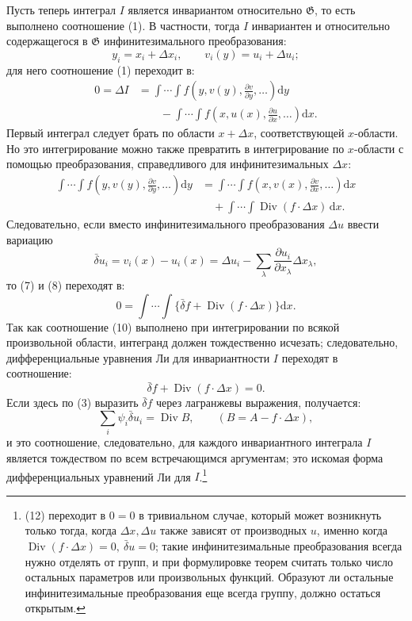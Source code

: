 \documentclass[11pt]{article}
\providecommand{\G}{\mathfrak G}
\providecommand{\D}{\Delta}
\providecommand{\p}{\partial}
\providecommand{\dd}{\mathrm d}
\DeclareMathOperator{\Div}{Div}
\providecommand{\bd}{\bar{\delta}}
\begin{document}
Пусть теперь интеграл \(I\) является инвариантом относительно \(\G\), то есть выполнено соотношение (1). В частности, тогда \(I\) инвариантен и относительно содержащегося в \(\G\) инфинитезимального преобразования:
\[
y_i=x_i+\D x_i,\qquad v_i(y)=u_i+\D u_i;
\]
для него соотношение (1) переходит в:
\begin{equation}
\begin{aligned}
0=\D I
&=\int\!\cdots\!\int f\!\left(y,v(y),\frac{\p v}{\p y},\ldots\right)\dd y\\
&\qquad-\int\!\cdots\!\int f\!\left(x,u(x),\frac{\p u}{\p x},\ldots\right)\dd x.
\end{aligned}
\tag{7}
\end{equation}
Первый интеграл следует брать по области \(x+\D x\), соответствующей \(x\)-области. Но это интегрирование можно также превратить в интегрирование по \(x\)-области с помощью преобразования, справедливого для инфинитезимальных \(\D x\):
\begin{equation}
\begin{aligned}
\int\!\cdots\!\int f\!\left(y,v(y),\frac{\p v}{\p y},\ldots\right)\dd y
&=\int\!\cdots\!\int f\!\left(x,v(x),\frac{\p v}{\p x},\ldots\right)\dd x\\
&\quad+\int\!\cdots\!\int \Div(f\cdot \D x)\,\dd x.
\end{aligned}
\tag{8}
\end{equation}
Следовательно, если вместо инфинитезимального преобразования \(\D u\) ввести вариацию
\begin{equation}
\bd u_i=v_i(x)-u_i(x)=\D u_i-\sum_\lambda\frac{\p u_i}{\p x_\lambda}\D x_\lambda,
\tag{9}
\end{equation}
то (7) и (8) переходят в:
\begin{equation}
0=\int\!\cdots\!\int\{\bd f+\Div(f\cdot\D x)\}\dd x.
\tag{10}
\end{equation}
Так как соотношение (10) выполнено при интегрировании по всякой произвольной области, интегранд должен тождественно исчезать; следовательно, дифференциальные уравнения Ли для инвариантности \(I\) переходят в соотношение:
\begin{equation}
\bd f+\Div(f\cdot\D x)=0.
\tag{11}
\end{equation}
Если здесь по (3) выразить \(\bd f\) через лагранжевы выражения, получается:
\begin{equation}
\sum_i\psi_i\bd u_i=\Div B,\qquad (B=A-f\cdot\D x),
\tag{12}
\end{equation}
и это соотношение, следовательно, для каждого инвариантного интеграла \(I\) является тождеством по всем встречающимся аргументам; это искомая форма дифференциальных уравнений Ли для \(I\).\footnote{(12) переходит в \(0=0\) в тривиальном случае, который может возникнуть только тогда, когда \(\D x,\D u\) также зависят от производных \(u\), именно когда \(\Div(f\cdot\D x)=0,\ \bd u=0\); такие инфинитезимальные преобразования всегда нужно отделять от групп, и при формулировке теорем считать только число остальных параметров или произвольных функций. Образуют ли остальные инфинитезимальные преобразования еще всегда группу, должно остаться открытым.}
\end{document}
